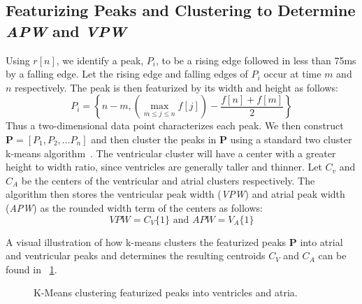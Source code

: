 \documentclass[conference]{IEEEtran}
\newcommand{\APW}{\textit{APW}}
\newcommand{\VPW}{\textit{VPW}}
\begin{document}
\subsection{Featurizing Peaks and Clustering to Determine \APW{} and \VPW}
Using $r[n]$, we identify a peak, $P_i$, to be a rising edge
followed in less than 75ms by a falling edge. Let the
rising edge and falling edges of $P_i$ occur at time $m$ and $n$
respectively. The peak is then featurized by its width and
height as follows:
\begin{equation*}
	P_i = \left\{n-m, \left( \max\limits_{m\le j\le n} f[j] \right) - \frac{f[n]+f[m]}{2} \right\}
\end{equation*}
Thus a two-dimensional data point characterizes each
peak. We then construct $\mathbf{P} = [P_1, P_2, \dots P_n]$ and then
cluster the peaks in $\mathbf{P}$ using a standard two cluster k-means
algorithm~\cite{k-means}. The ventricular cluster will have a
center with a greater height to width ratio, since
ventricles are generally taller and thinner. Let $C_v$ and $C_A$
be the centers of the ventricular and atrial clusters
respectively. The algorithm then stores the ventricular
peak width (\VPW) and atrial peak width (\APW) as the
rounded width term of the centers as follows:
\begin{equation*}
	VPW=C_V\{1\} \text{ and } APW=V_A\{1\}
\end{equation*}

A visual illustration of how k-means clusters the
featurized peaks $\mathbf{P}$ into atrial and ventricular peaks and
determines the resulting centroids $C_V$ and $C_A$ can be
found in  \figurename~\ref{fig:kmeans}.


\begin{figure}
	\centering
	\caption{
	K-Means clustering featurized peaks into ventricles and atria.}
		\label{fig:kmeans}
\end{figure}
\end{document}
